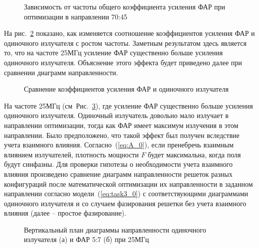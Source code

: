 \begin{figure}[!h]
\caption{Зависимость от частоты общего коэффициента усиления ФАР при оптимизации в направлении 70:45}
\label{ris:paa_gains_0}
\end{figure}

На рис.~\ref{ris:all_gains_0} показано, как изменяется соотношение коэффициентов усиления ФАР и одиночного излучателя с ростом частоты. Заметным результатом здесь является то, что на частоте 25МГц усиление ФАР существенно больше усиления одиночного излучателя. Объяснение этого эффекта будет приведено далее при сравнении диаграмм направленности.

\begin{figure}[!h]
\caption{Сравнение коэффициентов усиления ФАР и одиночного излучателя}
\label{ris:all_gains_0}
\end{figure}

На частоте 25МГц (см~Рис.~\ref{ris:f25mhs_0}), где усиление ФАР существенно больше усиления одиночного излучателя. Одиночный излучатель довольно мало излучает в направлении оптимизации, тогда как ФАР имеет максимум излучения в этом направлении. Было предположено, что такой эффект был получен вследствие учета взаимного влияния. Согласно~(\ref{eq:A_0}), если пренебречь взаимным влиянием излучателей, плотность мощности $F$ будет максимальна, когда поля будут синфазны. Для проверки гипотезы о необходимости учета взаимного влияния произведено сравнение диаграмм направленности решеток разных конфигураций после математической оптимизации их направленности в заданном направлении согласно модели~(\ref{eq:task3_0}) с соответствующими диаграммами одиночного излучателя и со случаем фазирования решетки без учета взаимного влияния (далее – простое фазирование).

\begin{figure}[!h]
\begin{minipage}[h]{0.49\linewidth}
\end{minipage}
\hfill
\begin{minipage}[h]{0.49\linewidth}
\end{minipage}
\caption{Вертикальный план диаграммы направленности одиночного излучателя (а) и ФАР 5:7 (б) при 25МГц}
\label{ris:f25mhs_0}
\end{figure}

